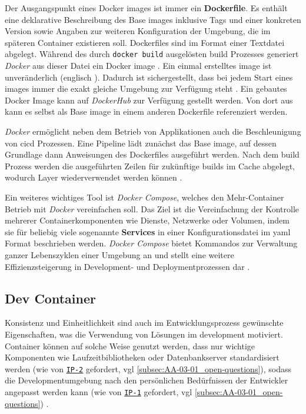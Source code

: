 Der Ausgangspunkt eines Docker \Glspl{image} ist immer ein \textbf{Dockerfile}. Es enthält eine deklarative Beschreibung des Base \Glspl{image} inklusive Tags und einer konkreten Version sowie Angaben zur weiteren Konfiguration der Umgebung, die im späteren Container existieren soll. Dockerfiles sind im Format einer Textdatei abgelegt. Während des durch \texttt{docker build} ausgelösten \Gls{build} Prozesses generiert \textit{Docker} aus dieser Datei ein Docker \Gls{image} \cite{020:Assessing-and-Improving-Quality-of-Docker-Artifacts}. Ein einmal erstelltes \Gls{image} ist unveränderlich (englisch ). Dadurch ist sichergestellt, dass bei jedem Start eines \Glspl{image} immer die exakt gleiche Umgebung zur Verfügung steht \cite{014:Managing-Container-based-Software-Development-Environments}. Ein gebautes Docker Image kann auf \textit{DockerHub} zur Verfügung gestellt werden. Von dort aus kann es selbst als Base \Gls{image} in einem anderen Dockerfile referenziert werden.

\textit{Docker} ermöglicht neben dem Betrieb von Applikationen auch die Beschleunigung von \Gls{cicd} Prozessen. Eine Pipeline lädt zunächst das Base \Gls{image}, auf dessen Grundlage dann Anweisungen des Dockerfiles ausgeführt werden. Nach dem \Gls{build} Prozess werden die ausgeführten Zeilen für zukünftige \Glspl{build} im Cache abgelegt, wodurch Layer wiederverwendet werden können \cite{022:Automated-Cloud-Infrastructure-Continous-Integration-and-Continous-Delivery-using-Docker}.

Ein weiteres wichtiges Tool ist \textit{Docker Compose}, welches den Mehr-Container Betrieb mit \textit{Docker} vereinfachen soll. Das Ziel ist die Vereinfachung der Kontrolle mehrerer Containerkomponenten wie Dienste, Netzwerke oder Volumen, indem sie für beliebig viele sogenannte \textbf{Services} in einer Konfigurationsdatei im \Gls{yaml} Format beschrieben werden. \textit{Docker Compose} bietet Kommandos zur Verwaltung ganzer Lebenszyklen einer Umgebung an und stellt eine weitere Effizienzsteigerung in Development- und Deploymentprozessen dar \cite{308:Docker-Compose-Overview}.

\subsection{Dev Container}
\label{subsec:05-01-02_dev-container}

Konsistenz und Einheitlichkeit sind auch im Entwicklungsprozess gewünschte Eigenschaften, was die Verwendung von  Lösungen im \Gls{development} motiviert. Container können auf solche Weise genutzt werden, dass nur wichtige Komponenten wie Laufzeitbibliotheken oder Datenbankserver standardisiert werden (wie von \texttt{\hyperref[sec:AA-02_interview-persons]{IP-2}} gefordert, \acrshort{vgl} \autoref{subsec:AA-03-01_open-questions}), sodass die Developmentumgebung nach den persönlichen Bedürfnissen der Entwickler angepasst werden kann (wie von \texttt{\hyperref[sec:AA-02_interview-persons]{IP-1}} gefordert, \acrshort{vgl} \autoref{subsec:AA-03-01_open-questions}) \cite{014:Managing-Container-based-Software-Development-Environments}.

